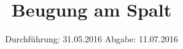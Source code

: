 

\subject{V406 Korrektur}
\title{Beugung am Spalt}
\date{
  Durchführung: 31.05.2016
  \hspace{3em}
  Abgabe: 11.07.2016
}



\maketitle
\thispagestyle{empty}
\tableofcontents
\newpage







\printbibliography


